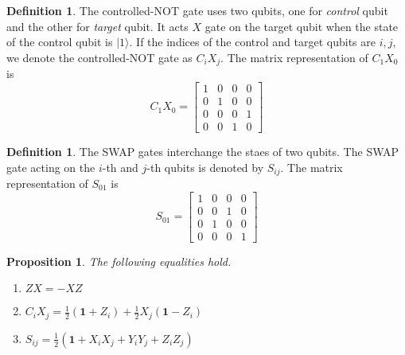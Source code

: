 \documentclass{beamer}
\theoremstyle{plain}
\newtheorem{prop}[thm]{Proposition}
\theoremstyle{definition}
\newtheorem{defn}[thm]{Definition}
\begin{document}
\begin{frame}
\begin{defn}
The controlled-NOT gate uses two qubits,
one for \textit{control} qubit and the other for \textit{target} qubit.
It acts $X$ gate on the target qubit 
when the state of the control qubit is $|1\rangle$.
If the indices of the control and target qubits are $i, j$,
we denote the controlled-NOT gate as $C_iX_j$.
The matrix representation of $C_1X_0$ is
	$$C_1X_0 = \begin{bmatrix}
		1 & 0 & 0 & 0 \\
		0 & 1 & 0 & 0 \\
		0 & 0 & 0 & 1 \\
		0 & 0 & 1 & 0 
	\end{bmatrix}$$
\end{defn}	
\end{frame}

\begin{frame}
\begin{defn}
The SWAP gates interchange the staes of two qubits.
The SWAP gate acting on the $i$-th and $j$-th qubits is 
denoted by $S_{ij}$. The matrix representation of $S_{01}$ is
	$$S_{01} = \begin{bmatrix}
		1 & 0 & 0 & 0 \\
		0 & 0 & 1 & 0 \\
		0 & 1 & 0 & 0 \\
		0 & 0 & 0 & 1 
	\end{bmatrix}$$
\end{defn}
\end{frame}

\begin{frame}
\begin{prop}
The following equalities hold.
\begin{enumerate}
	\item $ZX = -XZ$
	\item $C_iX_j = \displaystyle\frac{1}{2}(\mathbf 1 + Z_i) + \frac{1}{2}X_j(\mathbf 1 - Z_i)$
	\item $S_{ij} = \displaystyle\frac{1}{2}(\mathbf 1 + X_iX_j + Y_iY_j + Z_iZ_j)$
\end{enumerate}
\end{prop}
\end{frame}
\end{document}
